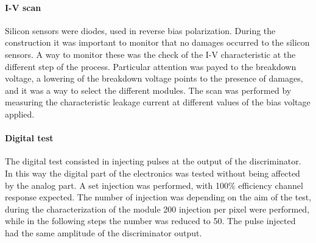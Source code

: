 \paragraph{I-V scan}
Silicon sensors were diodes, used in reverse bias polarization. During the construction it was important to monitor that no damages occurred to the silicon sensors. A way to monitor these was the check of the I-V characteristic at the different step of the process. Particular attention was payed to the breakdown voltage, a lowering of the breakdown voltage points to the presence of damages, and it was a way to select the different modules.
The scan was performed by measuring the characteristic leakage current at different values of the bias voltage applied.

\paragraph{Digital test}
The digital test consisted in injecting pulses at the output of the discriminator. In this way the digital part of the electronics was tested without being affected by the analog part. A set injection was performed, with 100$\percent$ efficiency channel response expected. The number of injection was depending on the aim of the test, during the characterization of the module 200 injection per pixel were performed, while in the following steps the number was reduced to 50. The pulse injected had the same amplitude of the discriminator output.

